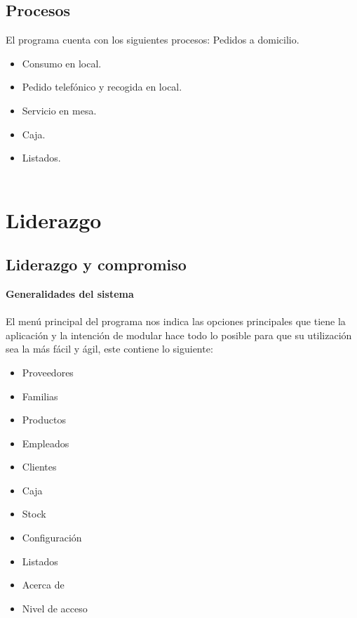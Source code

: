 \documentclass[12pt,a4paper]{article}
\begin{document}
\subsection{Procesos}
El programa cuenta con los siguientes procesos:
Pedidos a domicilio.
\begin{itemize}
\item Consumo en local.
\item Pedido telefónico y recogida en local.
\item Servicio en mesa.
\item Caja.
\item Listados.\\\\
\end{itemize}

\section{Liderazgo}\textbf{}
\subsection{Liderazgo y compromiso}
\textbf {Generalidades del sistema}\\\\
El menú principal del programa nos indica las opciones principales que tiene la aplicación y la intención de modular hace todo lo posible para que su utilización sea la más fácil y ágil, este contiene lo siguiente:
\begin{itemize}
\item Proveedores
\item Familias
\item Productos
\item Empleados
\item Clientes
\item Caja
\item Stock
\item Configuración
\item Listados
\item Acerca de
\item Nivel de acceso\\\\
\end{itemize}
\end{document}
